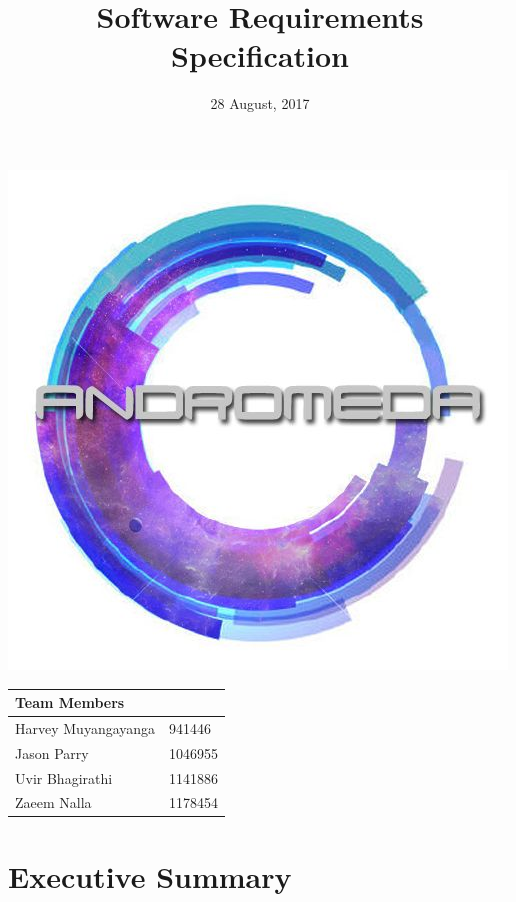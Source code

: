 \documentclass{article}
\begin{document}
\begin{titlepage}
\title{\textbf{\Huge Software Requirements Specification}}
\date{\large 28 August, 2017}
\bigskip
\bigskip
\maketitle
\thispagestyle{empty}
\centerline{\includegraphics[scale=0.65]{AndromedaLogo}}

\begin{table}
\Large
\begin{center}
\begin{tabular}{|m{5cm}|m{5cm}|}
\hline
\multicolumn{2}{|m{10cm}|}{\textbf{Team Members}\centering} \\
\hline
\hline
Harvey Muyangayanga & 941446\\
Jason Parry & 1046955\\
Uvir Bhagirathi & 1141886\\
Zaeem Nalla & 1178454\\
\hline
\end{tabular}
\end{center}
\end{table}

\end{titlepage}
\section{Executive Summary}
\end{document}
